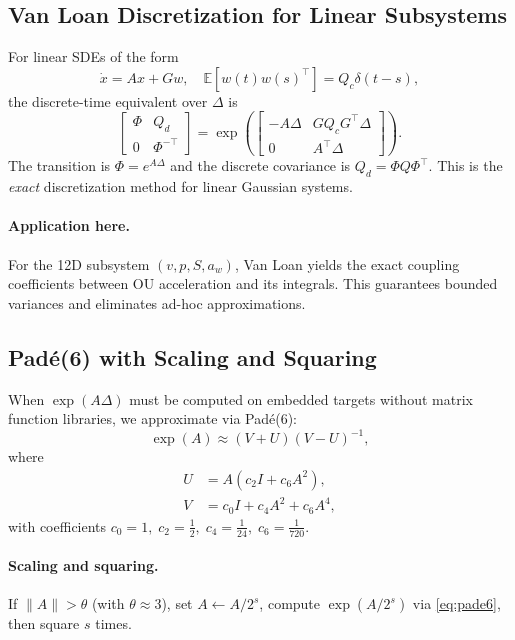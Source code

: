 \documentclass[10pt]{extarticle}
\begin{document}
\subsection{Van Loan Discretization for Linear Subsystems}
For linear SDEs of the form
\[
\dot x = A x + G w,\quad \mathbb{E}[w(t)w(s)^\top] = Q_c\delta(t-s),
\]
the discrete-time equivalent over $\Delta$ is
\begin{equation}
\begin{bmatrix}
\Phi & Q_d\\ 0 & \Phi^{-\top}
\end{bmatrix}
=
\exp\!\left(
\begin{bmatrix}
-A\Delta & GQ_cG^\top\Delta\\
0 & A^\top\Delta
\end{bmatrix}
\right).
\label{eq:van-loan-final}
\end{equation}
The transition is $\Phi=e^{A\Delta}$ and the discrete covariance is
$Q_d=\Phi Q\Phi^\top$. This is the \emph{exact} discretization method
for linear Gaussian systems.

\paragraph{Application here.}
For the 12D subsystem $(v,p,S,a_w)$, Van Loan yields the exact coupling
coefficients between OU acceleration and its integrals. This guarantees
bounded variances and eliminates ad-hoc approximations.

\subsection{Pad\'e(6) with Scaling and Squaring}
When $\exp(A\Delta)$ must be computed on embedded targets without matrix
function libraries, we approximate via Pad\'e(6):
\begin{equation}
\exp(A) \approx (V+U)(V-U)^{-1},
\label{eq:pade6}
\end{equation}
where
\begin{align}
U &= A\left(c_2 I + c_6 A^2\right),\\
V &= c_0 I + c_4 A^2 + c_6 A^4,
\end{align}
with coefficients $c_0=1,\;c_2=\tfrac{1}{2},\;c_4=\tfrac{1}{24},\;c_6=\tfrac{1}{720}$.

\paragraph{Scaling and squaring.}
If $\|A\|>\theta$ (with $\theta\approx 3$), set $A\leftarrow A/2^s$,
compute $\exp(A/2^s)$ via \eqref{eq:pade6}, then square $s$ times.
\end{document}
